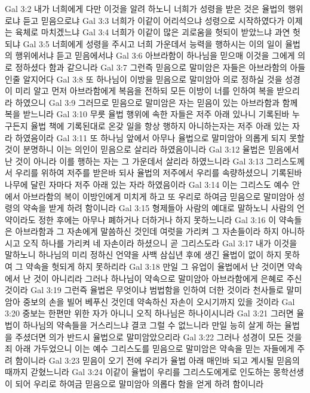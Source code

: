 Gal 3:2  내가 너희에게 다만 이것을 알려 하노니 너희가 성령을 받은 것은 율법의 행위로냐 듣고 믿음으로냐
Gal 3:3  너희가 이같이 어리석으냐 성령으로 시작하였다가 이제는 육체로 마치겠느냐
Gal 3:4  너희가 이같이 많은 괴로움을 헛되이 받았느냐 과연 헛되냐
Gal 3:5  너희에게 성령을 주시고 너희 가운데서 능력을 행하시는 이의 일이 율법의 행위에서냐 듣고 믿음에서냐
Gal 3:6  아브라함이 하나님을 믿으매 이것을 그에게 의로 정하셨다 함과 같으니라
Gal 3:7  그런즉 믿음으로 말미암은 자들은 아브라함의 아들인줄 알지어다
Gal 3:8  또 하나님이 이방을 믿음으로 말미암아 의로 정하실 것을 성경이 미리 알고 먼저 아브라함에게 복음을 전하되 모든 이방이 너를 인하여 복을 받으리라 하였으니
Gal 3:9  그러므로 믿음으로 말미암은 자는 믿음이 있는 아브라함과 함께 복을 받느니라
Gal 3:10  무릇 율법 행위에 속한 자들은 저주 아래 있나니 기록된바 누구든지 율법 책에 기록된대로 온갖 일을 항상 행하지 아니하는자는 저주 아래 있는 자라 하였음이라
Gal 3:11  또 하나님 앞에서 아무나 율법으로 말미암아 의롭게 되지 못할 것이 분명하니 이는 의인이 믿음으로 살리라 하였음이니라
Gal 3:12  율법은 믿음에서 난 것이 아니라 이를 행하는 자는 그 가운데서 살리라 하였느니라
Gal 3:13  그리스도께서 우리를 위하여 저주를 받은바 되사 율법의 저주에서 우리를 속량하셨으니 기록된바 나무에 달린 자마다 저주 아래 있는 자라 하였음이라
Gal 3:14  이는 그리스도 예수 안에서 아브라함의 복이 이방인에게 미치게 하고 또 우리로 하여금 믿음으로 말미암아 성령의 약속을 받게 하려 함이니라
Gal 3:15  형제들아 사람의 예대로 말하노니 사람의 언약이라도 정한 후에는 아무나 폐하거나 더하거나 하지 못하느니라
Gal 3:16  이 약속들은 아브라함과 그 자손에게 말씀하신 것인데 여럿을 가리켜 그 자손들이라 하지 아니하시고 오직 하나를 가리켜 네 자손이라 하셨으니 곧 그리스도라
Gal 3:17  내가 이것을 말하노니 하나님의 미리 정하신 언약을 사백 삼십년 후에 생긴 율법이 없이 하지 못하여 그 약속을 헛되게 하지 못하리라
Gal 3:18  만일 그 유업이 율법에서 난 것이면 약속에서 난 것이 아니리라 그러나 하나님이 약속으로 말미암아 아브라함에게 은혜로 주신 것이라
Gal 3:19  그런즉 율법은 무엇이냐 범법함을 인하여 더한 것이라 천사들로 말미암아 중보의 손을 빌어 베푸신 것인데 약속하신 자손이 오시기까지 있을 것이라
Gal 3:20  중보는 한편만 위한 자가 아니니 오직 하나님은 하나이시니라
Gal 3:21  그러면 율법이 하나님의 약속들을 거스리느냐 결코 그럴 수 없느니라 만일 능히 살게 하는 율법을 주셨더면 의가 반드시 율법으로 말미암았으리라
Gal 3:22  그러나 성경이 모든 것을 죄 아래 가두었으니 이는 예수 그리스도를 믿음으로 말미암은 약속을 믿는 자들에게 주려 함이니라
Gal 3:23  믿음이 오기 전에 우리가 율법 아래 매인바 되고 계시될 믿음의 때까지 갇혔느니라
Gal 3:24  이같이 율법이 우리를 그리스도에게로 인도하는 몽학선생이 되어 우리로 하여금 믿음으로 말미암아 의롭다 함을 얻게 하려 함이니라
